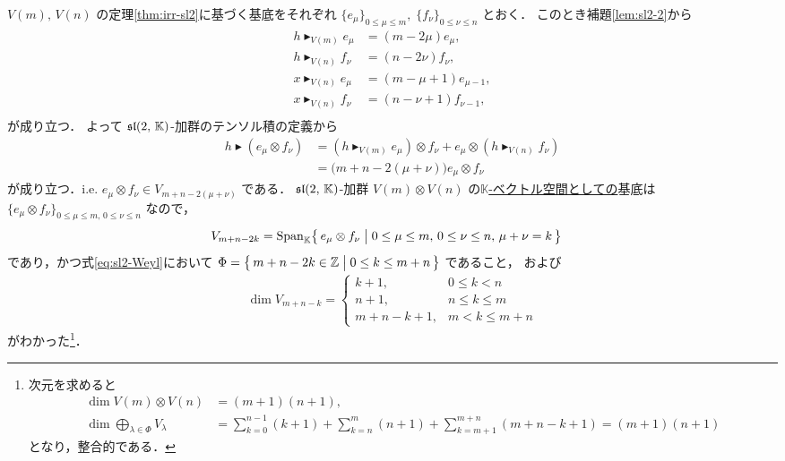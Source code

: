 \documentclass{ltjsarticle}
\theoremstyle{mystyle} %
\numberwithin{equation}{section}
\newcommand{\btr}{\blacktriangleright}
\begin{document}
$V(m),\, V(n)$ の定理\ref{thm:irr-sl2}に基づく基底をそれぞれ $\{e_\mu\}_{0 \le \mu \le m},\; \{f_\nu\}_{0 \le \nu \le n}$ とおく．
このとき補題\ref{lem:sl2-2}から
\begin{align}
    h \btr_{V(m)} e_\mu &= (m - 2\mu)e_\mu, \\
    h \btr_{V(n)} f_\nu &= (n - 2\nu)f_\nu, \\
    x \btr_{V(n)} e_{\mu} &= (m - \mu + 1)e_{\mu-1}, \\
    x \btr_{V(n)} f_\nu &= (n - \nu + 1)f_{\nu-1}, \\
\end{align}
が成り立つ．
よって $\mathfrak{sl}(2,\, \mathbb{K})$-加群のテンソル積の定義から
\begin{align}
    h \btr (e_\mu \otimes f_\nu) &= ( h \btr_{V(m)} e_\mu) \otimes f_\nu + e_\mu \otimes ( h \btr_{V(n)} f_\nu) \\
    &= \bigl(m+n - 2(\mu + \nu)\bigr) e_\mu \otimes f_\nu
\end{align}
が成り立つ．i.e. $e_\mu \otimes f_\nu \in V_{m+n-2(\mu+\nu)}$ である． 
$\mathfrak{sl}(2,\, \mathbb{K})$-加群 $V(m) \otimes V(n)$ の\underline{$\mathbb{K}$-ベクトル空間としての}基底は $\{e_\mu \otimes f_\nu\}_{0 \le \mu \le m,\, 0 \le \nu \le n}$ なので，
\begin{align}
    V_{m+n-2k} 
    &= \operatorname{Span}_{\mathbb{K}} \bigl\{\, e_\mu \otimes f_{\nu} \bigm| 0 \le \mu \le m,\, 0 \le \nu \le n,\, \mu + \nu = k \,\bigr\}
\end{align}
であり，かつ式\eqref{eq:sl2-Weyl}において $\Phi = \bigl\{\, m+n-2k \in \mathbb{Z} \bigm| 0 \le k \le m+n\,\bigr\}$ であること，
および
\begin{align}
    \dim V_{m+n-k} 
    =
    \begin{cases}
        k+1, &0 \le k < n \\
        n+1, &n \le k \le m \\
        m+n-k+1, &m < k \le m+n
    \end{cases}
\end{align}
がわかった\footnote{次元を求めると
\begin{align}
    \dim V(m) \otimes V(n) &= (m+1)(n+1),\\
    \dim \bigoplus_{\lambda \in \Phi} V_\lambda &= \sum_{k=0}^{n-1} (k+1) + \sum_{k=n}^{m} (n+1) + \sum_{k=m+1}^{m+n} (m+n-k+1) = (m+1)(n+1)
\end{align}
となり，整合的である．
}．
\end{document}
